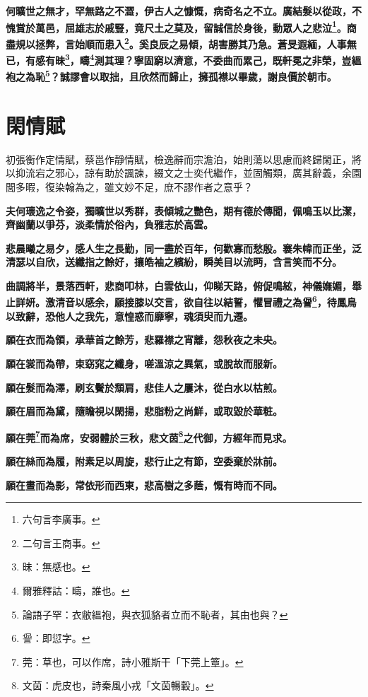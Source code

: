 \textbf{何曠世之無才，罕無路之不澀，伊古人之慷慨，病奇名之不立。廣結髮以從政，不愧賞於萬邑，屈雄志於戚豎，竟尺土之莫及，留誠信於身後，動眾人之悲泣\footnote{六句言李廣事。}。商盡規以拯弊，言始順而患入\footnote{二句言王商事。}。奚良辰之易傾，胡害勝其乃急。蒼旻遐緬，人事無已，有感有昧\footnote{昧：無感也。}，疇\footnote{爾雅釋詁：疇，誰也。}測其理？寧固窮以濟意，不委曲而累己，既軒冕之非榮，豈縕袍之為恥\footnote{論語子罕：衣敝縕袍，與衣狐貉者立而不恥者，其由也與？}？誠謬會以取拙，且欣然而歸止，擁孤襟以畢歲，謝良價於朝市。}

\section{閑情賦\hspace{1ex}{\footnotesize 并序}}

\begin{quoting}初張衡作定情賦，蔡邕作靜情賦，檢逸辭而宗澹泊，始則蕩以思慮而終歸閑正，將以抑流宕之邪心，諒有助於諷諫，綴文之士奕代繼作，並固觸類，廣其辭義，余園閭多暇，復染翰為之，雖文妙不足，庶不謬作者之意乎？\end{quoting}

\textbf{夫何瓌逸之令姿，獨曠世以秀群，表傾城之艷色，期有德於傳聞，佩鳴玉以比潔，齊幽蘭以爭芬，淡柔情於俗內，負雅志於高雲。}

\textbf{悲晨曦之易夕，感人生之長勤，同一盡於百年，何歡寡而愁殷。褰朱幃而正坐，泛清瑟以自欣，送纖指之餘好，攘皓袖之繽紛，瞬美目以流眄，含言笑而不分。}

\textbf{曲調將半，景落西軒，悲商叩林，白雲依山，仰睇天路，俯促鳴絃，神儀嫵媚，舉止詳妍。激清音以感余，願接膝以交言，欲自往以結誓，懼冒禮之為諐\footnote{諐：即愆字。}，待鳳鳥以致辭，恐他人之我先，意惶惑而靡寧，魂須臾而九遷。}

\textbf{願在衣而為領，承華首之餘芳，悲羅襟之宵離，怨秋夜之未央。}

\textbf{願在裳而為帶，束窈窕之纖身，嗟溫涼之異氣，或脫故而服新。}

\textbf{願在髮而為澤，刷玄鬢於頹肩，悲佳人之屢沐，從白水以枯煎。}

\textbf{願在眉而為黛，隨瞻視以閑揚，悲脂粉之尚鮮，或取毀於華粧。}

\textbf{願在莞\footnote{莞：草也，可以作席，詩小雅斯干「下莞上簟」。}而為席，安弱體於三秋，悲文茵\footnote{文茵：虎皮也，詩秦風小戎「文茵暢轂」。}之代御，方經年而見求。}

\textbf{願在絲而為履，附素足以周旋，悲行止之有節，空委棄於牀前。}

\textbf{願在晝而為影，常依形而西東，悲高樹之多蔭，慨有時而不同。}

